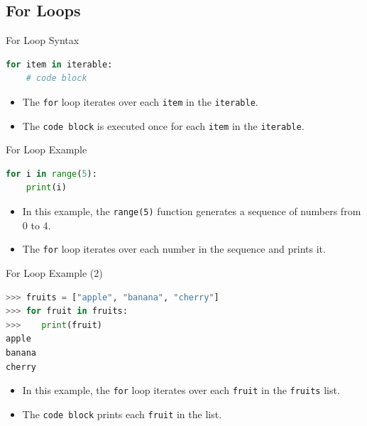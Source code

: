 \subsection{For Loops}
\begin{frame}[fragile]{For Loop Syntax}
    \begin{lstlisting}[language=Python]
for item in iterable:
    # code block
    \end{lstlisting}
    \begin{itemize}
        \item The \texttt{for} loop iterates over each \texttt{item} in the \texttt{iterable}.
        \item The \texttt{code block} is executed once for each \texttt{item} in the \texttt{iterable}.
    \end{itemize}
\end{frame}

\begin{frame}[fragile]{For Loop Example}
    \begin{lstlisting}[language=Python]
for i in range(5):
    print(i)
    \end{lstlisting}
    \begin{itemize}
        \item In this example, the \texttt{range(5)} function generates a sequence of numbers from 0 to 4.
        \item The \texttt{for} loop iterates over each number in the sequence and prints it.
    \end{itemize}
\end{frame}

\begin{frame}[fragile]{For Loop Example (2)}
    \begin{lstlisting}[language=Python]
>>> fruits = ["apple", "banana", "cherry"]
>>> for fruit in fruits:
>>>    print(fruit)
apple
banana
cherry
    \end{lstlisting}
    \begin{itemize}
        \item In this example, the \texttt{for} loop iterates over each \texttt{fruit} in the \texttt{fruits} list.
        \item The \texttt{code block} prints each \texttt{fruit} in the list.
    \end{itemize}
\end{frame}

